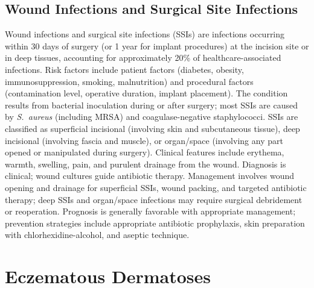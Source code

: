 \subsection{Wound Infections and Surgical Site Infections}
\label{sec:Wound Infections and Surgical Site Infections}
Wound infections and surgical site infections (SSIs) are infections occurring within 30 days of surgery (or 1 year for implant procedures) at the incision site or in deep tissues, accounting for approximately 20\% of healthcare-associated infections. Risk factors include patient factors (diabetes, obesity, immunosuppression, smoking, malnutrition) and procedural factors (contamination level, operative duration, implant placement). The condition results from bacterial inoculation during or after surgery; most SSIs are caused by \textit{S.~aureus} (including MRSA) and coagulase-negative staphylococci. SSIs are classified as superficial incisional (involving skin and subcutaneous tissue), deep incisional (involving fascia and muscle), or organ/space (involving any part opened or manipulated during surgery). Clinical features include erythema, warmth, swelling, pain, and purulent drainage from the wound. Diagnosis is clinical; wound cultures guide antibiotic therapy. Management involves wound opening and drainage for superficial SSIs, wound packing, and targeted antibiotic therapy; deep SSIs and organ/space infections may require surgical debridement or reoperation. Prognosis is generally favorable with appropriate management; prevention strategies include appropriate antibiotic prophylaxis, skin preparation with chlorhexidine-alcohol, and aseptic technique.

\section{Eczematous Dermatoses}






